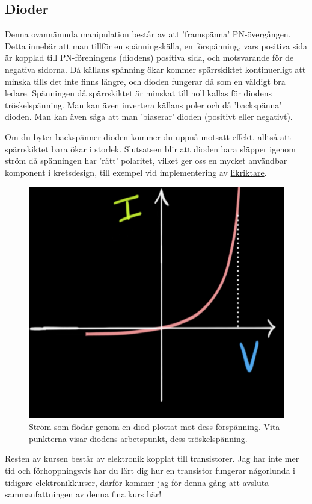 \subsection{Dioder}
Denna ovannämnda manipulation består av att 'framspänna' PN-övergången. Detta innebär att man tillför en spänningskälla, en förspänning, vars positiva sida är kopplad till PN-föreningens (diodens) positiva sida, och motsvarande för de negativa sidorna. Då källans spänning ökar kommer spärrskiktet kontinuerligt att minska tills det inte finns längre, och dioden fungerar då som en väldigt bra ledare. Spänningen då spärrskiktet är minskat till noll kallas för diodens tröskelspänning. Man kan även invertera källans poler och då 'backspänna' dioden. Man kan även säga att man 'biaserar' dioden (positivt eller negativt).

Om du byter backspänner dioden kommer du uppnå motsatt effekt, alltså att spärrskiktet bara ökar i storlek. Slutsatsen blir att dioden bara släpper igenom ström då spänningen har 'rätt' polaritet, vilket ger oss en mycket användbar komponent i kretsdesign, till exempel vid implementering av \href{https://sv.wikipedia.org/wiki/Likriktning}{likriktare}.

\begin{figure}[ht]
    \centering
    \includegraphics[scale = 0.3]{bilder/fig: arbetspunkt.png}
    \caption{Ström som flödar genom en diod plottat mot dess förspänning. Vita punkterna visar diodens arbetspunkt, dess tröskelspänning.}
    \label{fig:arbetspunkt}
\end{figure}

\newpage

Resten av kursen består av elektronik kopplat till transistorer. Jag har inte mer tid och förhoppningsvis har du lärt dig hur en transistor fungerar någorlunda i tidigare elektronikkurser, därför kommer jag för denna gång att avsluta sammanfattningen av denna fina kurs här! 

